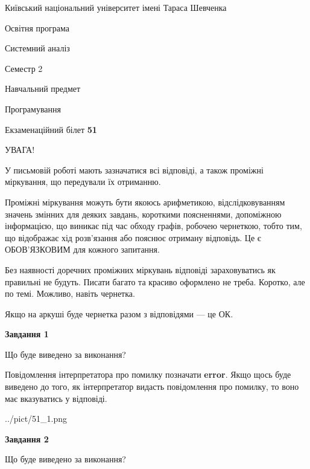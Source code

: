 \documentclass[12pt, ukrainian]{article}
\begin{document}
{{\begin {small}\par
{ \center  Київський національний університет імені Тараса Шевченка \par}
{\parbox {5 cm}{Освітня програма \hfill}{\parbox {7 cm}{Системний аналіз \hfill}}\parbox {6 cm}{\hfill Семестр 2}}\par
{\parbox {5 cm} {Навчальний предмет \hfill}\parbox {7 cm}{Програмування \hfill}\parbox {6cm}{\hfill}\par}\vspace{-7pt} \end{small}}{\center Екзаменаційний білет \No \textbf
{ 51 }\par}}
{
\begin {large}
УВАГА!

У письмовій роботі мають зазначатися всі відповіді, а також проміжні міркування, що передували їх отриманню.

Проміжні міркування можуть бути якоюсь арифметикою, відслідковуванням зна\-чень змінних для деяких завдань,
короткими поясненнями, допоміжною інформацією, що виникає під час обходу графів, робочею чернеткою,
тобто тим, що відображає хід розв’язання або пояснює отриману відповідь.
Це є ОБОВ’ЯЗКОВИМ для кожного запитання.

Без наявності доречних проміжних міркувань відповіді зараховуватись як правиль\-ні не будуть.
Писати багато та красиво оформлено не треба. Коротко, але по темі. Можли\-во, навіть чернетка.

Якщо на аркуші буде чернетка разом з відповідями --- це ОК.

\newpage

{\begin {center}\textbf{Завдання 1}\end {center}}\par
Що буде виведено за виконання?

Повідомлення інтерпретатора про помилку позначати \textbf{error}.
Якщо щось буде виведено до того, як інтерпретатор видасть повідомлення про помилку, 
то воно має вказуватись у відповіді. \par


\begin{center}
	{../pict/51_1.png}
\end{center}
\newpage

{\begin {center}\textbf{Завдання 2}\end {center}}\par
Що буде виведено за виконання?


\end{large}}
\end{document}
